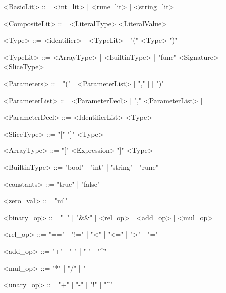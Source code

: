 \documentclass{article}
\begin{document}
\begin{grammar}
        <BasicLit>          ::=     <int_lit> | <rune_lit> | <string_lit>

        <CompositeLit>      ::=     <LiteralType> <LiteralValue>

        <Type>              ::=     <identifier> | <TypeLit> | "(" <Type> ")" 

        <TypeLit>           ::=     <ArrayType> | <BuiltinType> | "func" <Signature> | <SliceType>

        <Parameters>        ::=     "(" [ <ParameterList> [ "," ] ] ")"

        <ParameterList>     ::=     <ParameterDecl> [ "," <ParameterList> ]

        <ParameterDecl>     ::=     <IdentifierList> <Type>

        <SliceType>         ::=     "[" "]" <Type>

        <ArrayType>         ::=     "[" <Expression> "]" <Type>


        <BuiltinType>       ::=     "bool" | "int" | "string" | "rune"

        <constants>         ::=     "true" | "false"

        <zero_val>          ::=     "nil" 

        <binary_op>         ::=     "||" | "&&" | <rel_op> | <add_op> | <mul_op>

        <rel_op>            ::=     "==" | "!=" | "<" | "<=" | ">" | "\>="

        <add_op>            ::=     "+" | "-" | "|" | "^"

        <mul_op>            ::=     "*" | "/" | "%

        <unary_op>          ::=     "+" | "-" | "!" | "^"   

    \end{grammar}
\end{document}
